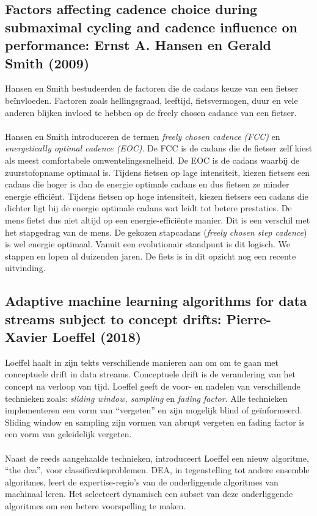 \subsection{Factors affecting cadence choice during submaximal cycling and cadence influence on performance: Ernst A. Hansen en Gerald Smith (2009)}
Hansen en Smith bestudeerden de factoren die de cadans keuze van een fietser beïnvloeden. Factoren zoals hellingsgraad, leeftijd, fietsvermogen, duur en vele anderen blijken invloed te hebben op de freely chosen cadance van een fietser.
\\\\
Hansen en Smith introduceren de termen \textit{freely chosen cadence (FCC)} en \textit{energetically optimal cadence (EOC)}. De FCC is de cadans die de fietser zelf kiest als meest comfortabele omwentelingssnelheid. De EOC is de cadans waarbij de zuurstofopname optimaal is. Tijdens fietsen op lage intensiteit, kiezen fietsers een cadans die hoger is dan de energie optimale cadans en dus fietsen ze minder energie efficiënt. Tijdens fietsen op hoge intensiteit, kiezen fietsers een cadans die dichter ligt bij de energie optimale cadans wat leidt tot betere prestaties. De mens fietst dus niet altijd op een energie-efficiënte manier. Dit is een verschil met het stapgedrag van de mens. De gekozen stapcadans (\textit{freely chosen step cadence}) is wel energie optimaal. Vanuit een evolutionair standpunt is dit logisch. We stappen en lopen al duizenden jaren. De fiets is in dit opzicht nog een recente uitvinding.

\subsection{Adaptive machine learning algorithms for data streams subject to concept drifts: Pierre-Xavier Loeffel (2018)}
Loeffel haalt in zijn tekts verschillende manieren aan om om te gaan met conceptuele drift in data streams. Conceptuele drift is de verandering van het concept na verloop van tijd. Loeffel geeft de voor- en nadelen van verschillende technieken zoals: \textit{sliding window, sampling} en \textit{fading factor}. Alle technieken implementeren een vorm van “vergeten” en zijn mogelijk blind of geïnformeerd. Sliding window en sampling zijn vormen van abrupt vergeten en fading factor is een vorm van geleidelijk vergeten.
\\\\
Naast de reeds aangehaalde technieken, introduceert Loeffel een nieuw algoritme, “the \gls{dea}”, voor classificatieproblemen. DEA, in tegenstelling tot andere ensemble algoritmes, leert de expertise-regio’s van de onderliggende algoritmes van machinaal leren. Het selecteert dynamisch een subset van deze onderliggende algoritmes om een betere voorspelling te maken.
